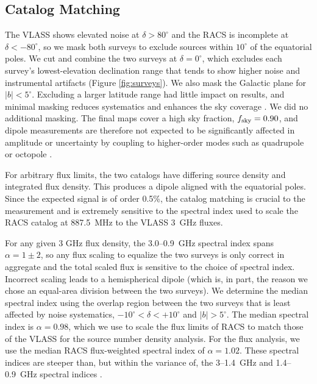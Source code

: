 \documentclass[twocolumn]{aastex63}
\begin{document}
\subsection{Catalog Matching}\label{subsec:matching}

The VLASS shows elevated noise at $\delta > 80^\circ$ and the RACS is incomplete at
$\delta < -80^\circ$, so we mask both surveys
to exclude sources within $10^\circ$ of the equatorial poles.
We cut and combine the two surveys at $\delta = 0^\circ$, which excludes each survey's lowest-elevation
declination range that tends to show higher noise and instrumental artifacts (Figure \ref{fig:surveys}).
We also mask the Galactic plane for $|b| < 5^\circ$.  Excluding a larger latitude range had little impact on results,
and minimal masking reduces systematics and enhances the sky coverage \citep[e.g.,][]{siewert2021}.
We did no additional masking. The final maps cover a high sky fraction, $f_{\rm sky} = 0.90$, and
dipole measurements are therefore not expected to be significantly affected in amplitude or uncertainty by coupling to higher-order modes such as quadrupole or octopole \citep{gibelyou2012}.

For arbitrary flux limits, the two catalogs have differing source density and integrated flux density.  This
produces a dipole aligned with the equatorial poles.  Since the expected signal is of order 0.5\%, the catalog
matching is crucial to the measurement and is extremely sensitive to the spectral index used to scale the RACS
catalog at 887.5~MHz to the VLASS 3~GHz fluxes.  

For any given 3 GHz flux density, the 3.0--0.9~GHz spectral index spans $\alpha = 1\pm2$, so any flux scaling to equalize
the two surveys is only correct in aggregate and the total scaled flux is sensitive to the choice of spectral index.
Incorrect scaling leads to a hemispherical dipole (which is, in part, the reason we chose an equal-area division
between the two surveys).
We determine the median spectral index using the overlap region between the two surveys that is least affected by
noise systematics, $-10^\circ < \delta < +10^\circ$ and $|b| > 5^\circ$.  The median spectral index is $\alpha = 0.98$,
which we use to scale the flux limits of RACS to match those of the VLASS for the source number density analysis.  
For the flux analysis, we use the median RACS flux-weighted spectral index of $\alpha = 1.02$.  These spectral indices
are steeper than, but within the variance of, the 3--1.4~GHz and 1.4--0.9~GHz spectral indices \citep{racsII_2021,gordon2021}.
\end{document}
